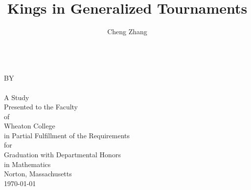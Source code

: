 \documentclass[12pt, oneside]{book}
\title{Kings in Generalized Tournaments}
\author{Cheng Zhang}
\begin{document}
  \begin{titlepage}
    \thispagestyle{empty}
    \doublespacing\centering

    \vfill
    \LARGE \textbf{\thetitle{}} \\
    \large BY \\
    \textbf{\theauthor{}} \\

    \vfill
    A Study \\
    Presented to the Faculty \\
    of \\
    Wheaton College \\
    in Partial Fulfillment of the Requirements \\
    for \\
    Graduation with Departmental Honors \\
    in Mathematics \\
    Norton, Massachusetts \\
    \monthyeardate\today

    \vfill
  \end{titlepage}

  \frontmatter
  
  

  \tableofcontents{}

  \mainmatter  %
  
  
  
  
  
  



  \clearpage{}\label{chap: list of figure}
  \listoffigures
  \printbibliography[heading=bibintoc]
  \clearpage{}\label{chap: index}
  \printindex
\end{document}
